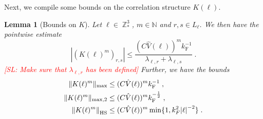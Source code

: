 \documentclass[sn-mathphys, Numbered ,a4paper]{sn-jnl}%
\DeclareMathOperator{\Z}{\mathbb{Z}}
\newcommand{\F}{\mathrm{F}}
\theoremstyle{plain}
\newtheorem{lemma}[theorem]{Lemma}
\theoremstyle{definition}
\theoremstyle{remark}
\theoremstyle{plain}
\theoremstyle{definition}
\theoremstyle{remark}
\begin{document}
Next, we compile some bounds on the correlation structure $ K(\ell) $.
\begin{lemma}[Bounds on $ K $]
	Let $ \ell \in \Z^3_* $, $ m \in \mathbb{N} $ and $ r,s \in L_\ell $. We then have the pointwise estimate
	\begin{equation} \label{eq:K_element_bounds}
		|(K(\ell)^m)_{r,s}|
		\le \frac{(C \hat{V}(\ell))^m k_{\F}^{-1}}{\lambda_{\ell,r} + \lambda_{\ell,s}} \;.
	\end{equation}
\textcolor{red}{[SL: Make sure that $ \lambda_{\ell,r} $ has been defined]} Further, we have the bounds
\begin{equation} \label{eq:K_max_bounds}
\begin{aligned}
	\Vert K(\ell)^m \Vert_{\mathrm{max}}
	&\le (C \hat{V}(\ell))^m k_{\F}^{-1} \;, \\
	\Vert K(\ell)^m \Vert_{\mathrm{max},2}
	&\le (C \hat{V}(\ell))^m k_{\F}^{-\frac 12} \;, \\
	\norm{K(\ell)^m}_{\mathrm{HS}}
	&\le (C \hat{V}(\ell))^m \min\{1,k^2_F\abs{\ell}^{-2}\} \;.
\end{aligned}   
\end{equation}
\end{lemma}
\end{document}
